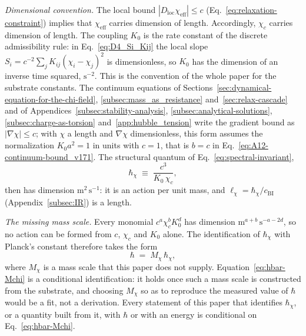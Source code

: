     \medskip
    \noindent\textit{Dimensional convention.}
    The local bound $|D_{\mathrm{loc}}\chi_{\mathrm{eff}}| \leq c$
    (Eq.~\eqref{eq:relaxation-constraint}) implies that
    $\chi_{\mathrm{eff}}$ carries dimension of length.
    Accordingly, $\chi_c$ carries dimension of length.
    The coupling $K_0$ is the rate constant of the discrete admissibility rule:
    in Eq.~\eqref{eq:D4_Si_Kij} the local slope $S_i = c^{-2}\sum_j K_{ij}(\chi_i-\chi_j)^2$ is dimensionless, so
    $K_0$ has the dimension of an inverse time squared, $\mathrm{s}^{-2}$.
    This is the convention of the whole paper for the substrate constants.
    The continuum equations of Sections~\ref{sec:dynamical-equation-for-the-chi-field},
    \ref{subsec:mass_as_resistance} and~\ref{sec:relax-cascade} and of
    Appendices~\ref{subsec:stability-analysis}, \ref{subsec:analytical-solutions},
    \ref{subsec:charge-as-torsion} and~\ref{app:hubble_tension} write the gradient bound as $|\nabla\chi| \le c$;
    with $\chi$ a length and $\nabla\chi$ dimensionless, this form assumes the normalization $K_0a^2 = 1$ in units
    with $c = 1$, that is $b = c$ in Eq.~\eqref{eq:A12-continuum-bound_v171}.
    The structural quantum of Eq.~\eqref{eq:spectral-invariant},
    \begin{equation}
      \hbar_\chi \;\equiv\; \frac{c^3}{K_0\,\chi_c},
      \label{eq:hbar_chi_def}
    \end{equation}
    then has dimension $\mathrm{m}^2\,\mathrm{s}^{-1}$: it is an action per unit mass, and
    $\ell_\chi = \hbar_\chi/c_{\mathrm{BI}}$ (Appendix~\ref{subsec:IR}) is a length.

    \medskip
    \noindent\textit{The missing mass scale.}
    Every monomial $c^{a}\chi_c^{b}K_0^{d}$ has dimension $\mathrm{m}^{a+b}\,\mathrm{s}^{-a-2d}$, so no action can be
    formed from $c$, $\chi_c$ and $K_0$ alone.
    The identification of $\hbar_\chi$ with Planck's constant therefore takes the form
    \begin{equation}
      \hbar \;=\; M_\chi\,\hbar_\chi ,
      \label{eq:hbar-Mchi}
    \end{equation}
    where $M_\chi$ is a mass scale that this paper does not supply.
    Equation~\eqref{eq:hbar-Mchi} is a conditional identification: it holds once such a mass scale is constructed
    from the substrate, and choosing $M_\chi$ so as to reproduce the measured value of $\hbar$ would be a fit, not a
    derivation.
    Every statement of this paper that identifies $\hbar_\chi$, or a quantity built from it, with $\hbar$ or with an
    energy is conditional on Eq.~\eqref{eq:hbar-Mchi}.

